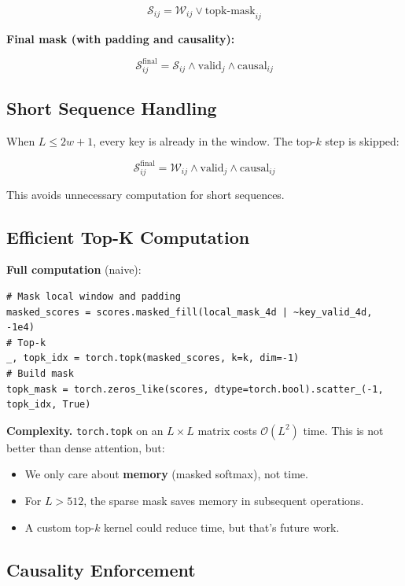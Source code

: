\[
\mathcal{S}_{ij} = \mathcal{W}_{ij} \lor \text{topk-mask}_{ij}
\tag{4.6}
\]

\textbf{Final mask (with padding and causality):}

\[
\mathcal{S}_{ij}^\text{final} = \mathcal{S}_{ij} \land \text{valid}_j \land \text{causal}_{ij}
\tag{4.7}
\]

\subsection{Short Sequence Handling}

When $L \leq 2w + 1$, every key is already in the window. The top-$k$ step 
is skipped:

\[
\mathcal{S}_{ij}^\text{final} = \mathcal{W}_{ij} \land \text{valid}_j \land \text{causal}_{ij}
\tag{4.8}
\]

This avoids unnecessary computation for short sequences.

\subsection{Efficient Top-K Computation}

\textbf{Full computation} (naive):

\begin{lstlisting}
# Mask local window and padding
masked_scores = scores.masked_fill(local_mask_4d | ~key_valid_4d, -1e4)
# Top-k
_, topk_idx = torch.topk(masked_scores, k=k, dim=-1)
# Build mask
topk_mask = torch.zeros_like(scores, dtype=torch.bool).scatter_(-1, topk_idx, True)
\end{lstlisting}

\textbf{Complexity.} \texttt{torch.topk} on an $L \times L$ matrix costs 
$\mathcal{O}(L^2)$ time. This is not better than dense attention, but:

\begin{itemize}
\item We only care about \textbf{memory} (masked softmax), not time.
\item For $L > 512$, the sparse mask saves memory in subsequent operations.
\item A custom top-$k$ kernel could reduce time, but that's future work.

\end{itemize}
\subsection{Causality Enforcement}

